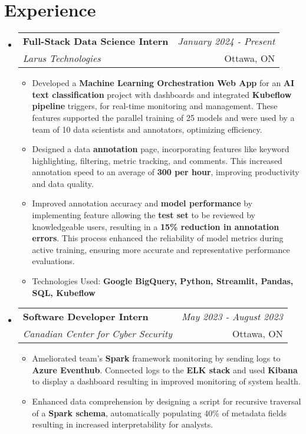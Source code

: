 \documentclass[a4paper,11pt]{article}
\makeatletter
\newcommand{\resumeSubheading}[4]{
\vspace{0.5mm}\item
    \begin{tabular*}{0.98\textwidth}[t]{l@{\extracolsep{\fill}}r}
        \textbf{#1} & \textit{\footnotesize{#4}} \\
        \textit{\footnotesize{#3}} &  \footnotesize{#2}\\
    \end{tabular*}
    \vspace{-2.4mm}
}
\newcommand{\resumeSubHeadingListStart}{\begin{itemize}[leftmargin=*,labelsep=0mm]}
\newcommand{\resumeItemListStart}{\begin{justify}\begin{itemize}[label=\textcolor{black}{--}, leftmargin=3ex, rightmargin=2ex, noitemsep,labelsep=1.2mm,itemsep=0mm]\small}
\newcommand{\resumeSubHeadingListEnd}{\end{itemize}\vspace{2mm}}
\newcommand{\resumeItemListEnd}{\end{itemize}\end{justify}\vspace{-2mm}}
\makeatother
\begin{document}
\section{\textbf{Experience}}
  \resumeSubHeadingListStart
  \resumeSubheading
      {Full-Stack Data Science Intern}{Ottawa, ON}
      {Larus Technologies}{January 2024 - Present}
      \vspace{1mm}
      \resumeItemListStart
    \item {Developed a \textbf{Machine Learning Orchestration Web App} for an \textbf{AI text classification} project with dashboards and integrated \textbf{Kubeflow pipeline} triggers, for real-time monitoring and management. These features supported the parallel training of 25 models and were used by a team of 10 data scientists and annotators, optimizing efficiency.}
    \vspace{1mm}
    \item {Designed a data \textbf{annotation} page, incorporating features like keyword highlighting, filtering, metric tracking, and comments. This increased annotation speed to an average of \textbf{300 per hour}, improving productivity and data quality.}
    \vspace{1mm}
    \item {Improved annotation accuracy and \textbf{model performance} by implementing feature allowing the \textbf{test set} to be reviewed by knowledgeable users, resulting in a \textbf{15\% reduction in annotation errors}. This process enhanced the reliability of model metrics during active training, ensuring more accurate and representative performance evaluations.}
    \vspace{1mm}
    \item {Technologies Used: \textbf{Google BigQuery, Python, Streamlit, Pandas, SQL, Kubeflow}}
    \vspace{1mm}
    \resumeItemListEnd
    
    \vspace{-3mm}

    \resumeSubheading
      {Software Developer Intern}{Ottawa, ON}
      {Canadian Center for Cyber Security}{May 2023 - August 2023}
      \vspace{1mm}
      \resumeItemListStart
    \item {Ameliorated team’s \textbf{Spark} framework monitoring by sending logs to \textbf{Azure Eventhub}. Connected logs to the \textbf{ELK stack} and used \textbf{Kibana} to display a dashboard resulting in improved monitoring of system health.}
    \vspace{1mm}
    \item {Enhanced data comprehension by designing a script for recursive traversal of a \textbf{Spark schema}, automatically populating 40\% of metadata fields resulting in increased interpretability for analysts.}
    \resumeItemListEnd
  \resumeSubHeadingListEnd
\vspace{-8mm}
\end{document}
